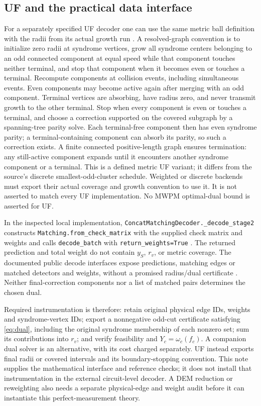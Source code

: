 \documentclass[11pt]{article}
\theoremstyle{definition}
\theoremstyle{plain}
\theoremstyle{remark}
\begin{document}
\subsection{UF and the practical data interface}
For a separately specified UF decoder one can use the same metric
ball definition with the radii from its actual growth run
\cite[Algorithm~1, Definition~8]{Meister}. A resolved-graph convention
is to initialize zero radii at syndrome vertices, grow all syndrome centers
belonging to an odd connected component at equal speed while that
component touches neither terminal, and stop that component when it
becomes even or touches a terminal. Recompute components at collision
events, including simultaneous events. Even components may become
active again after merging with an odd component. Terminal vertices
are absorbing, have radius zero, and never transmit growth to the
other terminal. Stop when every component is even or touches a
terminal, and choose a correction supported on the covered subgraph
by a spanning-tree parity solve. Each terminal-free component then
has even syndrome parity; a terminal-containing component can absorb
its parity, so such a correction exists.
A finite connected positive-length graph ensures termination:
any still-active component expands until it encounters another
syndrome component or a terminal.
This is a defined metric UF variant; it differs from the source's
discrete smallest-odd-cluster schedule. Weighted or discrete backends
must export their actual coverage and growth convention to use it.
It is not asserted to match every UF implementation.
No MWPM optimal-dual bound is asserted for UF.

In the inspected local implementation,
\texttt{ConcatMatchingDecoder.\_decode\_stage2} constructs
\texttt{Matching.from\_check\_matrix} with the supplied check matrix and weights
and calls \texttt{decode\_batch} with \texttt{return\_weights=True}
\cite{Implementation}. The returned prediction and total weight do
not contain $y_S$, $r_v$, or metric coverage. The documented public
decode interfaces expose predictions, matching edges or matched
detectors and weights, without a promised radius/dual certificate
\cite{PyMatching}. Neither final-correction components nor a list
of matched pairs determines the chosen dual.

Required instrumentation is therefore: retain original physical edge
IDs, weights and syndrome-vertex IDs; export a nonnegative odd-cut
certificate satisfying \eqref{eq:dual}, including the original
syndrome membership of each nonzero set; sum its contributions into
$r_v$; and verify feasibility and $Y_c=\omega_c(f_c)$.
A companion dual solver is an alternative, with its cost charged
separately. UF instead exports final radii or covered intervals and
its boundary-stopping convention. This note supplies the mathematical
interface and reference checks; it does not install that instrumentation
in the external circuit-level decoder. A DEM reduction or reweighting
also needs a separate physical-edge and weight audit before it can
instantiate this perfect-measurement theory.
\end{document}

